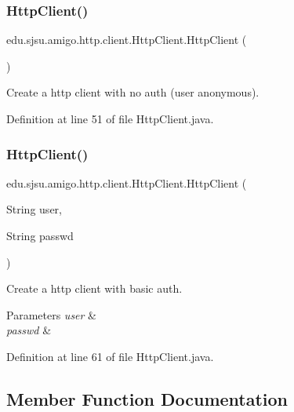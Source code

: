 \subsubsection{\texorpdfstring{Http\+Client()}{HttpClient()}\hspace{0.1cm}{\footnotesize\ttfamily [1/2]}}
{\footnotesize\ttfamily edu.\+sjsu.\+amigo.\+http.\+client.\+Http\+Client.\+Http\+Client (\begin{DoxyParamCaption}{ }\end{DoxyParamCaption})}

Create a http client with no auth (user anonymous). 

Definition at line 51 of file Http\+Client.\+java.

\mbox{\label{classedu_1_1sjsu_1_1amigo_1_1http_1_1client_1_1_http_client_ad32a0b638fbea3fb6c96f9b95a4f03f8}} 
\subsubsection{\texorpdfstring{Http\+Client()}{HttpClient()}\hspace{0.1cm}{\footnotesize\ttfamily [2/2]}}
{\footnotesize\ttfamily edu.\+sjsu.\+amigo.\+http.\+client.\+Http\+Client.\+Http\+Client (\begin{DoxyParamCaption}\item[{String}]{user,  }\item[{String}]{passwd }\end{DoxyParamCaption})}

Create a http client with basic auth.


\begin{DoxyParams}{Parameters}
{\em user} & \\
\hline
{\em passwd} & \\
\hline
\end{DoxyParams}


Definition at line 61 of file Http\+Client.\+java.



\subsection{Member Function Documentation}
\mbox{\label{classedu_1_1sjsu_1_1amigo_1_1http_1_1client_1_1_http_client_a5807fb0dab40c227bb34ffc14e708294}} 
